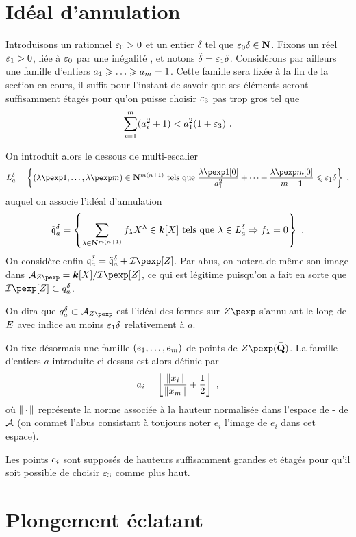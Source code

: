 \section{Idéal d'annulation}

Introduisons un rationnel $\varepsilon_0 > 0$ et un entier $\delta$ tel que
$\varepsilon_0\delta \in \mathbf{N}$. Fixons un réel $\varepsilon_1 > 0$, liée à $\varepsilon_0$ par une
inégalité , et notons $\tilde\delta =
\varepsilon_1\delta$. 
Considérons par ailleurs une famille d'entiers $a_1 \ge \dots \ge a_\puiss =
1$. Cette famille sera fixée à la fin de la section en cours, il suffit pour
l'instant de savoir que ses éléments seront suffisamment étagés pour qu'on
puisse choisir $\varepsilon_3$ pas trop gros \todo[à expliciter] tel que
\[
  \sum_{i=1}^{m} (a_i^2 +1) < a_1^2 (1 + \varepsilon_3) \text{ .}
\]

On introduit alors le dessous de multi-escalier
\[
  L_a^\delta = \left\{
	(\lambda\pexp1, \ldots, \lambda\pexp\puiss) \in \N^{\puiss(\dimp+1)}
	\text{ tels que }
	\frac {\lambda\pexp1[0]} {a_1^2} 
	+ \dots +
	\frac {\lambda\pexp\puiss[0]} {m-1}
	\le \eps_1 \delta
	\right\}
  \pmm,
\]
auquel on associe l'idéal d'annulation
\[
  \mathfrak{\tilde q}_a^\delta
  = \left\{
	\sum_{\lambda \in \mathbf{N}^{m(n+1)}} f_\lambda X^\lambda \in \boldsymbol{k} [X]
	\text{ tels que }
	\lambda \in L_a^\delta \Rightarrow f_\lambda = 0
	\right\}
  \text{ .}
\]
On considère enfin $\mathfrak{q}_a^\delta = \mathfrak{\tilde q}_a^\delta +
\varid$. Par abus, on notera de même son image dans $\mathcal{A}_{\var} = \cdn
[X] / \varid$, ce qui est légitime puisqu'on a fait en sorte que $\varid
\subset q_a^\delta$.

On dira que $q_a^\delta \subset \mathcal{A}_{\var}$ est l'idéal des formes sur
$\var$ s'annulant le long de $E$ avec indice au moins $\varepsilon_1 \delta$
relativement à $a$.

On fixe désormais une famille $(e_1, \dots, e_m)$ de points de
$\var(\bar\Q)$. La famille d'entiers $a$ introduite ci-dessus est alors définie
par 
\[
  a_i = \left\lfloor 
  \frac {\left\lVert x_i\right\rVert} {\left\lVert x_m\right\rVert} + \frac12 
  \right\rfloor
  \text{ ,}
\]
où $\left\lVert{\,\cdot\,}\right\rVert$ représente la norme associée à la hauteur normalisée dans
l'espace de - de ${\mathcal A}$ (on commet l'abus consistant à
toujours noter $e_i$ l'image de $e_i$ dans cet espace).

Les points $e_i$ sont supposés de hauteurs suffisamment grandes et étagés
pour qu'il soit possible de choisir $\varepsilon_3$ comme plus haut. 

\section{Plongement éclatant}


